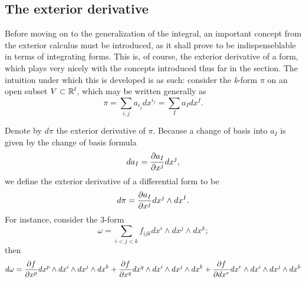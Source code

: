 \documentclass[.../main.tex]{subfiles}
\begin{document}
\subsection{The exterior derivative} \label{subsection: 3.3}
Before moving on to the generalization of the integral, an important concept from the exterior calculus must be introduced, as it shall prove to be indispenseblable in terms of integrating forms. This is, of course, the exterior derivative of a form, which plays very nicely with the concepts introduced thus far in the section. The intuition under which this is developed is as such: consider the \textit{k}-form $\pi$ on an open subset $V \subset \mathbb{R}^{l}$, which may be written generally as 
\begin{equation}
	\pi = \sum\limits_{i, j} a_{i_j} dx^{i_j} = \sum\limits_{I} a_I dx^I.
	\label{eq: 3.10}
\end{equation}

Denote by $d\pi$ the exterior derivative of $\pi$. Because a change of basis into $a_I$ is given by the change of basis formula
\begin{equation}
	da_I = \frac{\partial a_I}{\partial x^j}dx^j,
	\label{eq: 3.11}
\end{equation}
we define the exterior derivative of a differential form to be
\begin{equation}
	d\pi = \frac{\partial a_I}{\partial x^j}dx^j \wedge dx^I.
	\label{eq: 3.12}
\end{equation}
For instance, consider the 3-form 
\begin{equation}
	\omega  = \sum\limits_{i < j < k} f_{ijk} dx^i \wedge dx^j \wedge dx^k;
	\label{eq: 3.13}
\end{equation}
then
\begin{equation}
	d\omega = \frac{\partial f}{\partial x^p} dx^p \wedge dx^i \wedge dx^j \wedge dx^k + \frac{\partial f}{\partial x^q} dx^q \wedge dx^i \wedge dx^j \wedge dx^k + \frac{\partial f}{\partial dx^r} dx^r \wedge dx^i \wedge dx^j \wedge dx^k 
	\label{eq: 3.14}
\end{equation}
\end{document}

